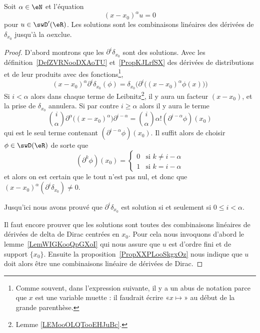 \begin{theorem}     \label{ThoRDUXooQBlLNb}
    Soit \( \alpha\in \eN\) et l'équation
    \begin{equation}        \label{EqDONTooKPfDWU}
        (x-x_0)^{\alpha}u=0
    \end{equation}
    pour \( u\in\swD'(\eR)\). Les solutions sont les combinaisons linéaires des dérivées de \( \delta_{x_0}\) jusqu'à la \( \alpha\)\ieme exclue.
\end{theorem}

\begin{proof}
    D'abord montrons que les \( \partial^i\delta_{x_0}\) sont des solutions. Avec les définition~\ref{DefZVRNooDXAoTU} et~\ref{PropKJLrfSX} des dérivées de distributions et de leur produits avec des fonctions\footnote{Comme souvent, dans l'expression suivante, il y a un abus de notation parce que \( x\) est une variable muette : il faudrait écrire «\( x\mapsto\)» au début de la grande parenthèse.},
    \begin{equation}
        (x-x_0)^{\alpha}\partial^i\delta_{x_0}(\phi)=\delta_{x_0}\Big( \partial^i\big( (x-x_0)^{\alpha}\phi(x) \big) \Big)
    \end{equation}
    Si \( i<\alpha\) alors dans chaque terme de Leibnitz\footnote{Lemme \ref{LEMooOLQTooEHJuBc}.}, il y aura un facteur \( (x-x_0)\), et la prise de \( \delta_{x_0}\) annulera. Si par contre \( i\geq \alpha\) alors il y aura le terme
    \begin{equation}
        \binom{ i }{ \alpha }\partial^{\alpha}\big( (x-x_0)^{\alpha} \big)\partial^{i-\alpha}=\binom{ i }{ \alpha }\alpha!(\partial^{i-\alpha}\phi)(x_0)
    \end{equation}
    qui est le seul terme contenant \( (\partial^{i-\alpha}\phi)(x_0)\). Il suffit alors de choisir \( \phi\in\swD(\eR) \) de sorte que
    \begin{equation}
        (\partial^k\phi)(x_0)=\begin{cases}
            0    &   \text{si } k\neq i-\alpha\\
            1    &    \text{si } k=i-\alpha
        \end{cases}
    \end{equation}
    et alors on est certain que le tout n'est pas nul, et donc que \( (x-x_0)^{\alpha}(\partial^i\delta_{x_0})\neq 0\).

    Jusqu'ici nous avons prouvé que \( \partial^i\delta_{x_0}\) est solution si et seulement si \( 0\leq i<\alpha\).

    Il faut encore prouver que les solutions sont toutes des combinaisons linéaires de dérivées de delta de Dirac centrées en \( x_0\). Pour cela nous invoquons d'abord le lemme~\ref{LemWIGKooQpGXoI} qui nous assure que \( u\) est d'ordre fini et de support \( \{ x_0 \}\). Ensuite la proposition~\ref{PropXXPLooSkgxOz} nous indique que \( u\) doit alors être une combinaisons linéaire de dérivées de Dirac.
\end{proof}

